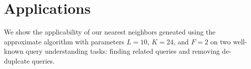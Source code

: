 \section{Applications}
We show the applicability of our nearest neighbors geneated using 
the approximate \dflip algorithm with parameters $L=10$, $K=24$, and $F=2$ on 
two well-known query understanding tasks: finding related queries and removing de-duplcate queries. 


